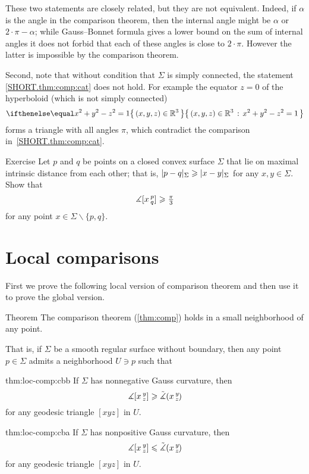 These two statements are closely related, but they are not equivalent.
Indeed, if $\alpha$ is the angle in the comparison theorem, then the internal angle might be $\alpha$ or $2\cdot\pi-\alpha$; while Gauss--Bonnet formula gives a lower bound on the sum of internal angles it does not forbid that each of these angles is close to $2\cdot \pi$.
However the latter is impossible by the comparison theorem.

Second, note that without condition that $\Sigma$ is simply connected, the statement \ref{SHORT.thm:comp:cat} does not hold.
For example the equator $z=0$ of the hyperboloid (which is not simply connected)
\[\set{(x,y,z)\in\RR^3}{x^2+y^2-z^2=1}\]
forms a triangle with all angles $\pi$, which contradict the comparison in~\ref{SHORT.thm:comp:cat}.

\begin{thm}{Exercise}\label{ex:diam-angle}
Let $p$ and $q$ be points on a closed convex surface $\Sigma$ that lie on maximal intrinsic distance from each other;
that is, $|p\z-q|_\Sigma\ge|x-y|_\Sigma$ for any $x,y\in \Sigma$.
Show that 
\[\measuredangle[x\,{}^{p}_{q}]\geqslant \tfrac\pi3\]
for any point $x\in \Sigma\backslash\{p,q\}$.
\end{thm}


\section{Local comparisons}

First we prove the following local version of comparison theorem and then use it to prove the global version.

\begin{thm}{Theorem}\label{thm:loc-comp}
The comparison theorem (\ref{thm:comp}) holds in a small neighborhood of any point.

That is, if $\Sigma$ be a smooth regular surface without boundary,
then any point $p\in \Sigma$ admits a neighborhood $U\ni p$ such that 

\begin{subthm}{thm:loc-comp:cbb}
If $\Sigma$ has nonnegative Gauss curvature, then 
\[\measuredangle[x\,{}^{y}_{z}]\geqslant\tilde\measuredangle(x\,{}^{y}_{z}\hspace{-0.2ex})\]
for any geodesic triangle $[xyz]$ in $U$.
\end{subthm}

\begin{subthm}{thm:loc-comp:cba}
If $\Sigma$ has nonpositive Gauss curvature, then 
\[\measuredangle[x\,{}^{y}_{z}]\leqslant\tilde\measuredangle(x\,{}^{y}_{z}\hspace{-0.2ex})\]
for any geodesic triangle $[xyz]$ in $U$.
\end{subthm}
\end{thm}

